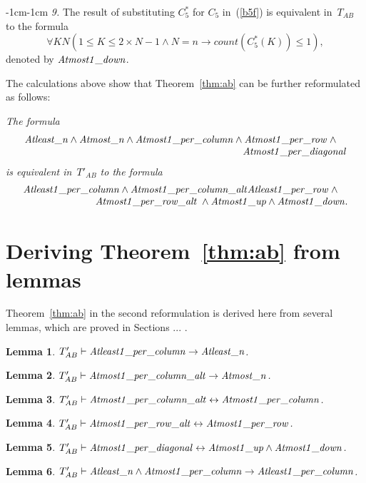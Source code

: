 \documentclass[11pt]{article}
\newtheorem{lemma}{Lemma}
\def\lrar{\leftrightarrow}
\def\beq{\begin{equation}}
\def\eeq#1{\label{#1}\end{equation}}
\def\ba{\begin{array}}
\def\ea{\end{array}}
\newcommand{\co}{\ensuremath{\mathit{count}}}
\def\aTwofgeq{\mathit{Atleast\_n\/}}
\def\aTwofleq{\mathit{Atmost\_n\/}}
\def\aThreefs{\mathit{Atmost1\_per\_column\/}}
\def\aFourfs{\mathit{Atmost1\_per\_row\/}}
\def\aFivefs{\mathit{Atmost1\_per\_diagonal\/}}
\def\bTwofgeq{\mathit{Atleast1\_per\_column\/}}
\def\bTwofleq{\mathit{Atmost1\_per\_column\_alt\/}}
\def\bThreefgeq{\mathit{Atleast1\_per\_row\/}}
\def\bThreefleq{\mathit{Atmost1\_per\_row\_alt\/}}
\def\bFourfs{\mathit{Atmost1\_up\/}}
\def\bFivefs{\mathit{Atmost1\_down\/}}
\begin{document}
\begin{adjustwidth}{-1cm}{-1cm}
\medskip\noindent\emph{9.}
The result of substituting $C_5^*$ for $C_5$ in~(\ref{b5f}) is equivalent
in~$T_{AB}$ to
the formula
$$
\forall KN(1\leq K\leq 2\times N-1 \land N=n \to \co(C^*_5(K))\leq 1),
$$
denoted by $\bFivefs$.

\medskip
The calculations above show that Theorem~\ref{thm:ab} can be further
reformulated as follows:

\medskip{}
\emph{The formula
\beq
\ba r
\aTwofgeq\land \aTwofleq\land \aThreefs\land \aFourfs\;\land\quad\\
\aFivefs
\ea
\eeq{gamma1}
is equivalent in~$T'_{AB}$ to the formula
\beq
\ba r
\bTwofgeq\land \bTwofleq\bThreefgeq\;\land\quad\\
\bThreefleq\;\land\bFourfs\land \bFivefs.
\ea
\eeq{gamma2}
}

\section{Deriving Theorem~\ref{thm:ab} from lemmas}\label{sec:deriving}

Theorem~\ref{thm:ab} in the second reformulation is derived here from
several lemmas, which are proved in Sections $...$ .
\medskip

\begin{lemma}\label{claim1}
$T'_{AB}\vdash \bTwofgeq \to \aTwofgeq$.
\end{lemma}
\medskip

\begin{lemma}\label{claim2}
$T'_{AB}\vdash \bTwofleq \to \aTwofleq$.
\end{lemma}
\medskip

\begin{lemma}\label{claim3}
$T'_{AB}\vdash \bTwofleq \lrar \aThreefs$.
\end{lemma}
\medskip

\begin{lemma}\label{claim4}
$T'_{AB}\vdash \bThreefleq\lrar\aFourfs$.
\end{lemma}
\medskip

\begin{lemma}\label{claim5}
$T'_{AB}\vdash \aFivefs \lrar \bFourfs \land \bFivefs$.
\end{lemma}
\medskip

\begin{lemma}\label{claim6}
$T'_{AB}\vdash\aTwofgeq  \land \aThreefs \to \bTwofgeq$.
\end{lemma}
\medskip
 

\end{adjustwidth}
\end{document}
